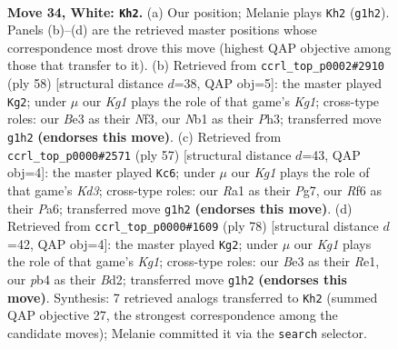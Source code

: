 \documentclass[11pt]{article}
\begin{document}
\clearpage

\begin{figure}[p]\centering
\begin{subfigure}{0.46\textwidth}\centering
\resizebox{\linewidth}{!}{%
\newchessgame
\chessboard[
  setfen={rnb1k3/8/5R2/3p4/pp6/4B3/PPP3P1/RN4K1 w - - 0 34},
  showmover=false,
  pgfstyle=straightmove, color=movearrow, markmove={g1-h2}
]}
\caption{}
\end{subfigure}\hfill
\begin{subfigure}{0.46\textwidth}\centering
\resizebox{\linewidth}{!}{%
\newchessgame
\chessboard[
  setfen={r4k2/2b2p2/4pp1p/1RP5/6P1/5N1P/5P2/6K1 w - - 1 30},
  showmover=false,
  pgfstyle=straightmove, color=movearrow, markmove={g1-g2}
]}
\caption{}
\end{subfigure}
\\[4pt]
\begin{subfigure}{0.46\textwidth}\centering
\resizebox{\linewidth}{!}{%
\newchessgame
\chessboard[
  setfen={8/5pp1/p2kp3/6p1/PP2P1P1/2P4P/3r4/1K5R b - - 0 29},
  showmover=false,
  pgfstyle=straightmove, color=movearrow, markmove={d6-c6}
]}
\caption{}
\end{subfigure}\hfill
\begin{subfigure}{0.46\textwidth}\centering
\resizebox{\linewidth}{!}{%
\newchessgame
\chessboard[
  setfen={8/4k3/p3P3/1p3p1b/2rp4/P5P1/3B1P2/4R1K1 w - - 1 40},
  showmover=false,
  pgfstyle=straightmove, color=movearrow, markmove={g1-g2}
]}
\caption{}
\end{subfigure}
\caption{\textbf{Move 34, White: \texttt{Kh2}.} (a) Our position; Melanie plays \texttt{Kh2} (\texttt{g1h2}). Panels (b)--(d) are the retrieved master positions whose correspondence most drove this move (highest QAP objective among those that transfer to it). (b) Retrieved from \texttt{ccrl\_top\_p0002\#2910} (ply 58) [structural distance $d$=38, QAP obj=5]: the master played \texttt{Kg2}; under $\mu$ our \emph{Kg1} plays the role of that game's \emph{Kg1}; cross-type roles: our \emph{B}e3 as their \emph{N}f3, our \emph{N}b1 as their \emph{P}h3; transferred move \texttt{g1h2} \textbf{(endorses this move)}. (c) Retrieved from \texttt{ccrl\_top\_p0000\#2571} (ply 57) [structural distance $d$=43, QAP obj=4]: the master played \texttt{Kc6}; under $\mu$ our \emph{Kg1} plays the role of that game's \emph{Kd3}; cross-type roles: our \emph{R}a1 as their \emph{P}g7, our \emph{R}f6 as their \emph{P}a6; transferred move \texttt{g1h2} \textbf{(endorses this move)}. (d) Retrieved from \texttt{ccrl\_top\_p0000\#1609} (ply 78) [structural distance $d$=42, QAP obj=4]: the master played \texttt{Kg2}; under $\mu$ our \emph{Kg1} plays the role of that game's \emph{Kg1}; cross-type roles: our \emph{B}e3 as their \emph{R}e1, our \emph{p}b4 as their \emph{B}d2; transferred move \texttt{g1h2} \textbf{(endorses this move)}. Synthesis: 7 retrieved analogs transferred to \texttt{Kh2} (summed QAP objective 27, the strongest correspondence among the candidate moves); Melanie committed it via the \texttt{search} selector.}
\label{fig:thought-m66}
\end{figure}
\end{document}
